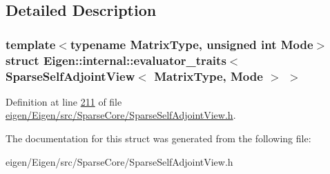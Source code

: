 \subsection{Detailed Description}
\subsubsection*{template$<$typename Matrix\+Type, unsigned int Mode$>$\newline
struct Eigen\+::internal\+::evaluator\+\_\+traits$<$ Sparse\+Self\+Adjoint\+View$<$ Matrix\+Type, Mode $>$ $>$}



Definition at line \hyperlink{eigen_2_eigen_2src_2_sparse_core_2_sparse_self_adjoint_view_8h_source_l00211}{211} of file \hyperlink{eigen_2_eigen_2src_2_sparse_core_2_sparse_self_adjoint_view_8h_source}{eigen/\+Eigen/src/\+Sparse\+Core/\+Sparse\+Self\+Adjoint\+View.\+h}.



The documentation for this struct was generated from the following file\+:\begin{DoxyCompactItemize}
\item 
eigen/\+Eigen/src/\+Sparse\+Core/\+Sparse\+Self\+Adjoint\+View.\+h\end{DoxyCompactItemize}
